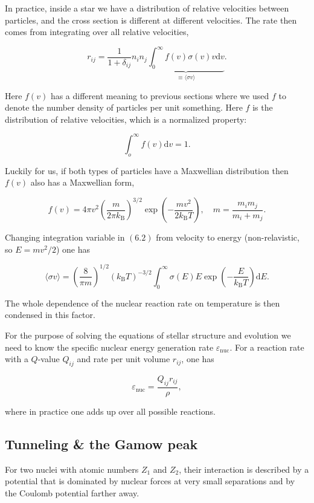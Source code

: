 \documentclass[twocolumn]{article}
\begin{document}
In practice, inside a star we have a distribution of relative velocities
between particles, and the cross section is different at different
velocities. The rate then comes from integrating over all relative
velocities,

\[r_{ij}=\frac{1}{1+\delta_{ij}}n_in_j\underbrace{\int_0^\infty f(v)\sigma(v)v\mathrm{d}v}_{\equiv \langle\sigma v\rangle}.\tag{6.2}\]

Here \(f(v)\) has a different meaning to previous sections where we used
\(f\) to denote the number density of particles per unit something. Here
\(f\) is the distribution of relative velocities, which is a normalized
property:

\[\int_o^\infty f(v)\mathrm{d}v=1.\]

Luckily for us, if both types of particles have a Maxwellian
distribution then \(f(v)\) also has a Maxwellian form,

\[f(v)=4\pi v^2\left(\frac{m}{2\pi k_\mathrm{B}}\right)^{3/2}\exp\left(-\frac{mv^2}{2k_\mathrm{B}T}\right),\quad m=\frac{m_im_j}{m_i+m_j}.\]

Changing integration variable in \((6.2)\) from velocity to energy
(non-relavistic, so \(E=mv^2/2\)) one has

\[\langle\sigma v\rangle=\left(\frac{8}{\pi m}\right)^{1/2}(k_\mathrm{B}T)^{-3/2}\int_0^\infty \sigma(E)E\exp\left(-\frac{E}{k_\mathrm{B}T}\right)\mathrm{d}E.\tag{6.3}\]

The whole dependence of the nuclear reaction rate on temperature is then
condensed in this factor.

For the purpose of solving the equations of stellar structure and
evolution we need to know the specific nuclear energy generation rate
\(\varepsilon_\mathrm{nuc}\). For a reaction rate with a \(Q\)-value
\(Q_{ij}\) and rate per unit volume \(r_{ij}\), one has

\[\varepsilon_\mathrm{nuc}=\frac{Q_{ij}r_{ij}}{\rho},\]

where in practice one adds up over all possible reactions.

\hypertarget{tunneling-the-gamow-peak}{%
\subsection{Tunneling \& the Gamow
peak}\label{tunneling-the-gamow-peak}}

For two nuclei with atomic numbers \(Z_1\) and \(Z_2\), their
interaction is described by a potential that is dominated by nuclear
forces at very small separations and by the Coulomb potential farther
away.
\end{document}

